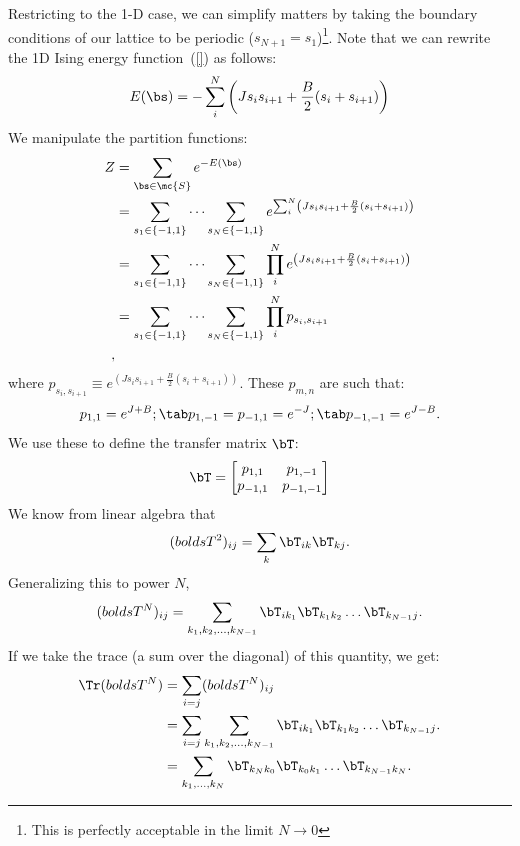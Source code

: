 Restricting to the 1-D case, we can simplify matters by taking the
boundary conditions of our lattice to be periodic
($s_{N+1}=s_{1}$)\footnote{This is perfectly acceptable in the limit
  $N\rightarrow 0$}. Note that we can rewrite the 1D Ising energy
function~(\ref{}) as follows:
\begin{equation}%
  E(\bs)=-\sum_i^N \left(J s_i s_{i+1} + \frac{B}{2}(s_i + s_{i+1})\right)
\end{equation}%
We manipulate the partition functions:
\begin{align}%
  Z&=\sum_{\bs\in\mc{S}}e^{-E(\bs)}\\
   &=\sum_{s_1\in\{-1,1\}}\dots \sum_{s_N\in\{-1,1\}}e^{\sum_i^N \left(J s_i s_{i+1} + \frac{B}{2}(s_i + s_{i+1})\right)}\\
   &=\sum_{s_1\in\{-1,1\}}\dots \sum_{s_N\in\{-1,1\}}\prod_i^N e^{\left(J s_i s_{i+1} + \frac{B}{2}(s_i + s_{i+1})\right)}\\
   &=\sum_{s_1\in\{-1,1\}}\dots \sum_{s_N\in\{-1,1\}}\prod_i^N p_{s_i,s_{i+1}}\\,
  \label{eq:partition-decomposition-1d}
\end{align}%
where
$p_{s_i,s_{i+1}}\equiv e^{\left(J s_i s_{i+1} + \frac{B}{2}(s_i +
    s_{i+1})\right)}$. These $p_{m,n}$ are such that:%
\begin{equation}%
  p_{1,1}=e^{J+B};\tab p_{1,-1}=p_{-1,1}=e^{-J};\tab p_{-1,-1}=e^{J-B}.
\end{equation}%
We use these to define the transfer matrix $\bT$:
\begin{equation}%
  \bT=
  \left[
    \begin{matrix}
      p_{1,1} & p_{1,-1} \\
      p_{-1,1} & p_{-1,-1}
    \end{matrix}
  \right]
\end{equation}%
We know from linear algebra that%
\begin{equation}%
  (bolds{T}^2)_{ij}=\sum_k \bT_{ik} \bT_{kj}.
\end{equation}%
Generalizing this to power $N$,
\begin{equation}%
  (bolds{T}^N)_{ij}=\sum_{k_1, k_2, \dots, k_{N-1}} \bT_{ik_1} \bT_{k_1 k_2} \dots \bT_{k_{N-1}j}.
\end{equation}%
If we take the trace (a sum over the diagonal) of this quantity, we
get:
\begin{align}%
  \Tr(bolds{T}^N)&=\sum_{i=j}(bolds{T}^N)_{ij}\\
                 &=\sum_{i=j}\sum_{k_1, k_2, \dots, k_{N-1}} \bT_{ik_1} \bT_{k_1 k_2} \dots \bT_{k_{N-1}j}.\\
                 &=\sum_{k_1, \dots, k_{N}} \bT_{k_N k_0} \bT_{k_0 k_1} \dots \bT_{k_{N-1}k_N}.\\
\end{align}%
